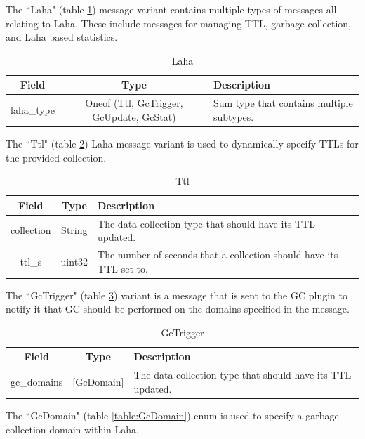 The ``Laha" (table \ref{table:Laha}) message variant contains multiple types of messages all relating to Laha. These include messages for managing TTL, garbage collection, and Laha based statistics.

\begin{table}[H]
	\centering
	\caption{Laha}
	\begin{tabular}{|c|c|p{8cm}|}
		\hline 
		Field & Type & Description  \\ 
		\hline
		laha\_type & Oneof (Ttl, GcTrigger, GcUpdate, GcStat) & Sum type that contains multiple subtypes. \\
		\hline
	\end{tabular} 
	\label{table:Laha}
\end{table}

The ``Ttl" (table \ref{table:Ttl}) Laha message variant is used to dynamically specify TTLs for the provided collection. 

\begin{table}[H]
	\centering
	\caption{Ttl}
	\begin{tabular}{|c|c|p{8cm}|}
		\hline 
		Field & Type & Description  \\ 
		\hline
		collection & String & The data collection type that should have its TTL updated.  \\
		\hline
		ttl\_s & uint32 & The number of seconds that a collection should have its TTL set to. \\
		\hline
	\end{tabular}
	\label{table:Ttl} 
\end{table}

The ``GcTrigger" (table \ref{table:GcTrigger}) variant is a message that is sent to the GC plugin to notify it that GC should be performed on the domains specified in the message.

\begin{table}[H]
	\centering
	\caption{GcTrigger}
	\begin{tabular}{|c|c|p{8cm}|}
		\hline 
		Field & Type & Description  \\ 
		\hline
		gc\_domains & [GcDomain] & The data collection type that should have its TTL updated.  \\
		\hline
	\end{tabular} 
	\label{table:GcTrigger}
\end{table}

The ``GcDomain" (table \ref{table:GcDomain}) enum is used to specify a garbage collection domain within Laha.

